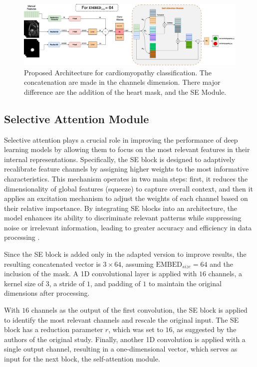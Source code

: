 \documentclass[journal,twoside,web]{ieeecolor}
\begin{document}
\begin{figure}[h]
\centerline{\includegraphics[width=\columnwidth]{figures/fig02.png}}
\caption{Proposed Architecture for cardiomyopathy classification. The concatenation are made in the channels dimension. There major difference are the addition of the heart mask, and the SE Module.}
\label{fig02}
\end{figure}

\subsection{Selective Attention Module}

Selective attention plays a crucial role in improving the performance of deep learning models by allowing them to focus on the most relevant features in their internal representations. Specifically, the \gls{SE} block is designed to adaptively recalibrate feature channels by assigning higher weights to the most informative characteristics. This mechanism operates in two main steps: first, it reduces the dimensionality of global features (squeeze) to capture overall context, and then it applies an excitation mechanism to adjust the weights of each channel based on their relative importance. By integrating \gls{SE} blocks into an architecture, the model enhances its ability to discriminate relevant patterns while suppressing noise or irrelevant information, leading to greater accuracy and efficiency in data processing \cite{yangNeuralNetworkDesign2024a}.

Since the \gls{SE} block is added only in the adapted version to improve results, the resulting concatenated vector is $3 \times 64$, assuming $\text{EMBED}_{size}= 64$ and the inclusion of the mask. A 1D convolutional layer is applied with $16$ channels, a kernel size of $3$, a stride of $1$, and padding of $1$ to maintain the original dimensions after processing.  

With $16$ channels as the output of the first convolution, the \gls{SE} block is applied to identify the most relevant channels and rescale the original input. The SE block has a reduction parameter $r$, which was set to $16$, as suggested by the authors of the original study. Finally, another 1D convolution is applied with a single output channel, resulting in a one-dimensional vector, which serves as input for the next block, the self-attention module.
\end{document}

